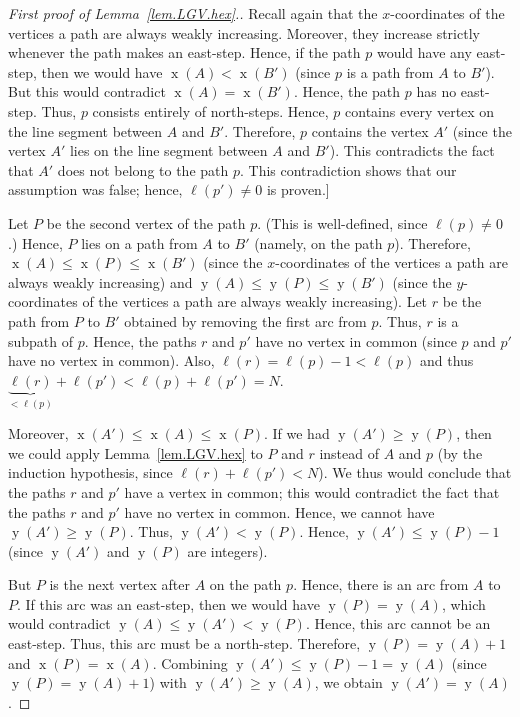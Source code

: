 \documentclass[reqno]{amsart}
\newcommand{\0}{\phantom{c}}
\DeclareMathOperator{\xcoord}{x} %
\DeclareMathOperator{\ycoord}{y} %
\newenvironment{verlong}{}{}
\theoremstyle{plain}
\theoremstyle{definition}
\numberwithin{equation}{section}
\begin{document}
\begin{verlong}
\begin{proof}[First proof of Lemma~\ref{lem.LGV.hex}.]
Recall again that the $x$-coordinates of the vertices a path are always weakly increasing.
Moreover, they increase strictly whenever the path makes an east-step.
Hence, if the path $p$ would have any east-step, then we would have $\xcoord(A) < \xcoord(B')$ (since $p$ is a path from $A$ to $B'$).
But this would contradict $\xcoord(A) = \xcoord(B')$.
Hence, the path $p$ has no east-step.
Thus, $p$ consists entirely of north-steps.
Hence, $p$ contains every vertex on the line segment between $A$ and $B'$.
Therefore, $p$ contains the vertex $A'$ (since the vertex $A'$ lies on the line segment between $A$ and $B'$).
This contradicts the fact that $A'$ does not belong to the path $p$.
This contradiction shows that our assumption was false; hence, $\ell(p') \neq 0$ is proven.]

Let $P$ be the second vertex of the path $p$.
(This is well-defined, since $\ell(p) \neq 0$.)
Hence, $P$ lies on a path from $A$ to $B'$ (namely, on the path $p$).
Therefore, $\xcoord(A) \leq \xcoord(P) \leq \xcoord(B')$ (since the $x$-coordinates of the vertices a path are
always weakly increasing) and $\ycoord(A) \leq \ycoord(P) \leq \ycoord(B')$ (since the $y$-coordinates of the vertices a path are always weakly increasing).
Let $r$ be the path from $P$ to $B'$ obtained by removing the first arc from $p$.
Thus, $r$ is a subpath of $p$.
Hence, the paths $r$ and $p'$ have no vertex in common (since $p$ and $p'$ have no vertex in common).
Also, $\ell(r) = \ell(p) - 1 < \ell(p)$ and thus $\underbrace{\ell(r)}_{<\ell(p)} + \ell(p') < \ell(p) + \ell(p') = N$.

Moreover, $\xcoord(A') \leq \xcoord(A) \leq \xcoord(P)$.
If we had $\ycoord(A') \geq \ycoord(P)$, then we could apply Lemma~\ref{lem.LGV.hex} to $P$ and $r$ instead of $A$ and $p$ (by the induction hypothesis, since $\ell(r) + \ell(p') < N$).
We thus would conclude that the paths $r$ and $p'$ have a vertex in common; this would contradict the fact that the paths $r$ and $p'$ have no vertex in common.
Hence, we cannot have $\ycoord(A') \geq \ycoord(P)$.
Thus, $\ycoord(A') < \ycoord(P)$.
Hence, $\ycoord(A') \leq \ycoord(P)  -1$ (since $\ycoord(A')$ and $\ycoord(P)$ are integers).

But $P$ is the next vertex after $A$ on the path $p$.
Hence, there is an arc from $A$ to $P$. If this arc was an east-step, then we would have $\ycoord(P) = \ycoord(A)$, which would contradict $\ycoord(A) \leq \ycoord(A') < \ycoord(P)$.
Hence, this arc cannot be an east-step.
Thus, this arc must be a north-step.
Therefore, $\ycoord(P) = \ycoord(A) + 1$ and $\xcoord(P) = \xcoord(A)$.
Combining $\ycoord(A') \leq \ycoord(P) - 1 = \ycoord(A)$ (since $\ycoord(P) = \ycoord(A) + 1$) with $\ycoord(A') \geq \ycoord(A)$, we obtain $\ycoord(A') = \ycoord(A)$.


\end{proof}
\end{verlong}
\end{document}
